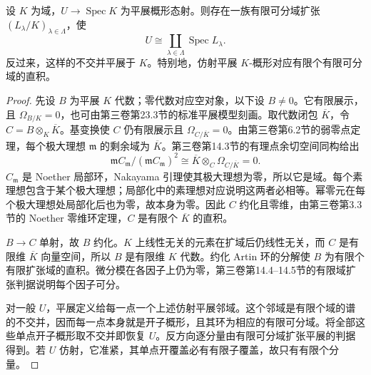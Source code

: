 \begin{lemma}\label{b4:lem:etale-over-field-components}
	设 \(K\) 为域，\(U\rightarrow\operatorname{Spec}K\) 为平展概形态射。则存在一族有限可分域扩张 \((L_\lambda/K)_{\lambda\in\Lambda}\)，使
	\[
		U\cong\coprod_{\lambda\in\Lambda}\operatorname{Spec}L_\lambda.
	\]
	反过来，这样的不交并平展于 \(K\)。特别地，仿射平展 \(K\)-概形对应有限个有限可分域的直积。
\end{lemma}
\begin{proof}
	先设 \(B\) 为平展 \(K\) 代数；零代数对应空对象，以下设 \(B\ne0\)。它有限展示，且 \(\Omega_{B/K}=0\)，也可由第三卷第23.3节的标准平展模型刻画。取代数闭包 \(\overline K\)，令 \(C=B\otimes_K\overline K\)。基变换使 \(C\) 仍有限展示且 \(\Omega_{C/\overline K}=0\)。由第三卷第6.2节的弱零点定理，每个极大理想 \(\mathfrak m\) 的剩余域为 \(\overline K\)。第三卷第14.3节的有理点余切空间同构给出
	\[
		\mathfrak mC_{\mathfrak m}/(\mathfrak mC_{\mathfrak m})^2 \cong\overline K\otimes_C\Omega_{C/\overline K}=0.
	\]
	\(C_{\mathfrak m}\) 是 Noether 局部环，Nakayama 引理使其极大理想为零，所以它是域。每个素理想包含于某个极大理想；局部化中的素理想对应说明这两者必相等。幂零元在每个极大理想处局部化后也为零，故本身为零。因此 \(C\) 约化且零维，由第三卷第3.3节的 Noether 零维环定理，\(C\) 是有限个 \(\overline K\) 的直积。

	\(B\rightarrow C\) 单射，故 \(B\) 约化。\(K\) 上线性无关的元素在扩域后仍线性无关，而 \(C\) 是有限维 \(\overline K\) 向量空间，所以 \(B\) 是有限维 \(K\) 代数。约化 Artin 环的分解使 \(B\) 为有限个有限扩张域的直积。微分模在各因子上仍为零，第三卷第14.4--14.5节的有限域扩张判据说明每个因子可分。

	对一般 \(U\)，平展定义给每一点一个上述仿射平展邻域。这个邻域是有限个域的谱的不交并，因而每一点本身就是开子概形，且其环为相应的有限可分域。将全部这些单点开子概形取不交并即恢复 \(U\)。反方向逐分量由有限可分域扩张平展的判据得到。若 \(U\) 仿射，它准紧，其单点开覆盖必有有限子覆盖，故只有有限个分量。
\end{proof}

